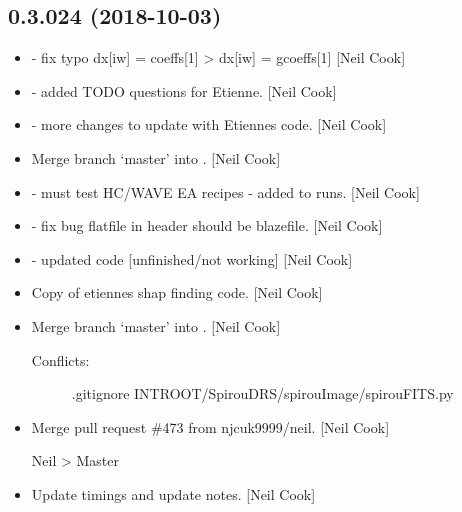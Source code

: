 \documentclass[a4paper,10pt,english]{report}
\begin{document}
\subsection{0.3.024 (2018-10-03)}
\label{\detokenize{misc/changelog:id307}}\begin{itemize}
\item {} 
 - fix typo dx{[}iw{]} = coeffs{[}1{]} \textendash{}\textgreater{} dx{[}iw{]} =
gcoeffs{[}1{]} {[}Neil Cook{]}

\item {} 
 - added TODO questions for Etienne. {[}Neil Cook{]}

\item {} 
 - more changes to update with Etiennes
 code. {[}Neil Cook{]}

\item {} 
Merge branch ‘master’ into . {[}Neil Cook{]}

\item {} 
 - must test HC/WAVE EA recipes - added to runs. {[}Neil
Cook{]}

\item {} 
 - fix bug flatfile in header should be
blazefile. {[}Neil Cook{]}

\item {} 
 - updated code {[}unfinished/not working{]} {[}Neil
Cook{]}

\item {} 
Copy of etiennes shap finding code. {[}Neil Cook{]}

\item {} 
Merge branch ‘master’ into . {[}Neil Cook{]}
\begin{description}
\item[{Conflicts:}] \leavevmode
.gitignore
INTROOT/SpirouDRS/spirouImage/spirouFITS.py

\end{description}

\item {} 
Merge pull request \#473 from njcuk9999/neil. {[}Neil Cook{]}

Neil \textendash{}\textgreater{} Master

\item {} 
Update timings and update notes. {[}Neil Cook{]}


\end{itemize}
\end{document}
